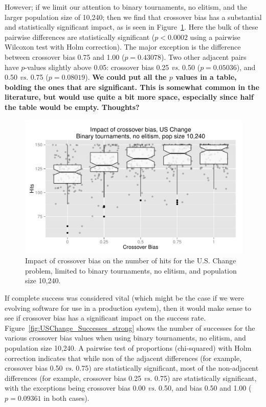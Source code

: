 \documentclass{sig-alternate}
\begin{document}
However; if we limit our attention to binary tournaments, no elitism, and the larger population size of 10,240; then we
find that crossover bias has a substantial and statistically significant impact, as is seen in
Figure~\ref{fig:USChange_Hits_strong}. Here the bulk of these pairwise differences are statistically significant
($p<0.0002$ using a pairwise Wilcoxon test with Holm correction). The major exception is the difference between
crossover bias 0.75 and 1.00 ($p=0.43078$). Two other adjacent pairs have $p$-values slightly above 0.05: crossover bias
0.25 \emph{vs.} 0.50 ($p=0.05036$), and 0.50 \emph{vs.} 0.75 ($p=0.08019$). \textbf{We could put all the $p$ values in
a table, bolding the ones that are significant. This is somewhat common in the literature, but would use quite a bit
more space, especially since half the table would be empty. Thoughts?}

\begin{figure}
\centering
\includegraphics[width=0.45 \textwidth]{Plots/US_change_hits_strong.pdf}
\caption{Impact of crossover bias on the number of hits for the U.S. Change problem, limited to binary 
tournaments, no elitism, and population size 10,240.}
\label{fig:USChange_Hits_strong}
\end{figure}

%
%
%
%

If complete success was considered vital (which might be the case if we were evolving software for use in a production
system), then it would make sense to see if crossover bias has a significant impact on the success rate.
Figure~\ref{fig:USChange_Successes_strong} shows the number of successes for the various crossover bias values when
using binary tournaments, no elitism, and population size 10,240. A pairwise test of proportions (chi-squared) with
Holm correction indicates that while non of the adjacent differences (for example, crossover bias 0.50 \emph{vs.} 0.75)
are statistically significant, most of the non-adjacent differences (for example, crossover bias 0.25 \emph{vs.} 0.75)
are statistically significant, with the exceptions being crossover bias 0.00 \emph{vs.} 0.50, and bias 0.50 and 1.00
($p=0.09361$ in both cases).
\end{document}
